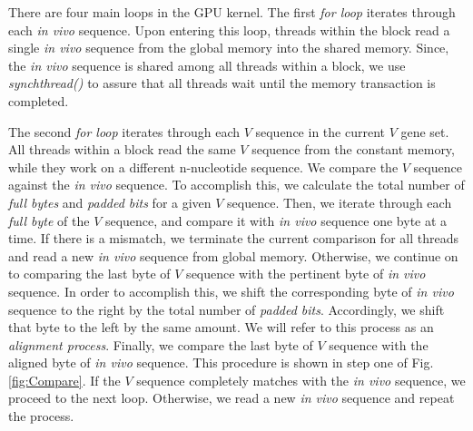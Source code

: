 %



There are four main loops in the GPU kernel. The first \emph{for loop} iterates through each \emph{in vivo} sequence. Upon entering this loop, threads within the block read a single \emph{in vivo} sequence from the global memory into the shared memory. Since, the \emph{in vivo} sequence is shared among all threads within a block, we use \emph{synchthread()} to assure that all threads wait until the memory transaction is completed. 


The second \emph{for loop} iterates through each $V$ sequence in the current $V$ gene set. All threads within a block read the same $V$ sequence from the constant memory, while they work on a different n-nucleotide sequence. We compare the $V$ sequence against the \emph{in vivo} sequence. To accomplish this, we calculate the total number of \emph{full bytes} and \emph{padded bits} for a given $V$ sequence. Then, we iterate through each \emph{full byte} of the $V$ sequence, and compare it with \emph{in vivo} sequence one byte at a time. If there is a mismatch, we terminate the current comparison for all threads and read a new \emph{in vivo} sequence from global memory. Otherwise, we continue on to comparing the last byte of $V$ sequence with the pertinent byte of \emph{in vivo} sequence. In order to accomplish this, we shift the corresponding byte of \emph{in vivo} sequence to the right by the total number of \emph{padded bits}. Accordingly, we shift that byte to the left by the same amount. We will refer to this process as an \emph{alignment process}. Finally, we compare the last byte of $V$ sequence with the aligned byte of \emph{in vivo} sequence. This procedure is shown in step one of Fig. \ref{fig:Compare}. If the $V$ sequence completely matches with the \emph{in vivo} sequence, we proceed to the next loop. Otherwise, we read a new \emph{in vivo} sequence and repeat the process.  


